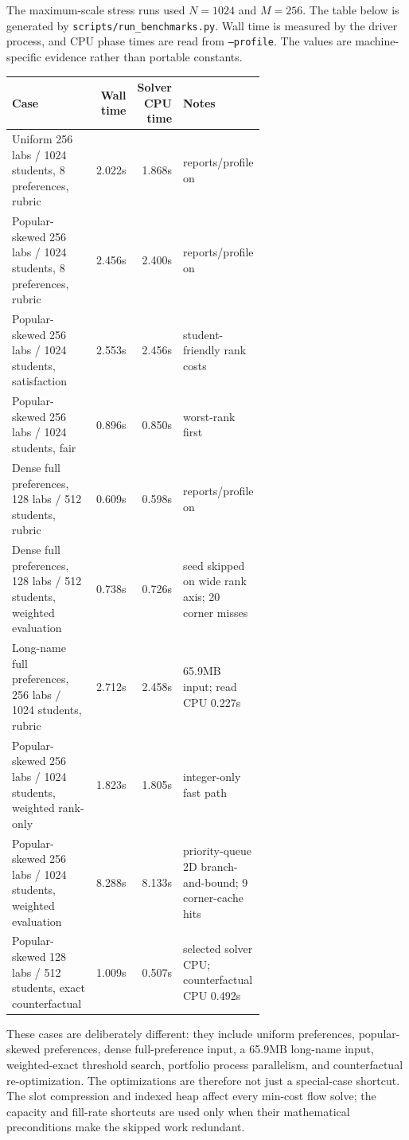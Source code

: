 \documentclass[11pt,a4paper]{article}
\begin{document}
The maximum-scale stress runs used \(N=1024\) and \(M=256\).  The table below
is generated by \texttt{scripts/run\_benchmarks.py}.  Wall time is measured by
the driver process, and CPU phase times are read from \texttt{--profile}.  The
values are machine-specific evidence rather than portable constants.

\begin{center}
{\small
\begin{tabular}{p{0.39\linewidth}rrp{0.24\linewidth}}
\toprule
Case & Wall time & Solver CPU time & Notes \\
\midrule
Uniform 256 labs / 1024 students, 8 preferences, rubric
  & 2.022s & 1.868s & reports/profile on \\
Popular-skewed 256 labs / 1024 students, 8 preferences, rubric
  & 2.456s & 2.400s & reports/profile on \\
Popular-skewed 256 labs / 1024 students, satisfaction
  & 2.553s & 2.456s & student-friendly rank costs \\
Popular-skewed 256 labs / 1024 students, fair
  & 0.896s & 0.850s & worst-rank first \\
Dense full preferences, 128 labs / 512 students, rubric
  & 0.609s & 0.598s & reports/profile on \\
Dense full preferences, 128 labs / 512 students, weighted evaluation
  & 0.738s & 0.726s
  & seed skipped on wide rank axis; 20 corner misses \\
Long-name full preferences, 256 labs / 1024 students, rubric
  & 2.712s & 2.458s & 65.9MB input; read CPU 0.227s \\
Popular-skewed 256 labs / 1024 students, weighted rank-only
  & 1.823s & 1.805s
  & integer-only fast path \\
Popular-skewed 256 labs / 1024 students, weighted evaluation
  & 8.288s & 8.133s
  & priority-queue 2D branch-and-bound; 9 corner-cache hits \\
Popular-skewed 128 labs / 512 students, exact counterfactual
  & 1.009s & 0.507s
  & selected solver CPU; counterfactual CPU 0.492s \\
\bottomrule
\end{tabular}
}
\end{center}

These cases are deliberately different: they include uniform preferences,
popular-skewed preferences, dense full-preference input, a 65.9MB long-name
input, weighted-exact threshold search, portfolio process parallelism, and
counterfactual re-optimization.  The
optimizations are therefore not just a special-case shortcut.  The slot
compression and indexed heap affect every min-cost flow solve; the capacity
and fill-rate shortcuts are used only when their mathematical preconditions
make the skipped work redundant.
\end{document}
